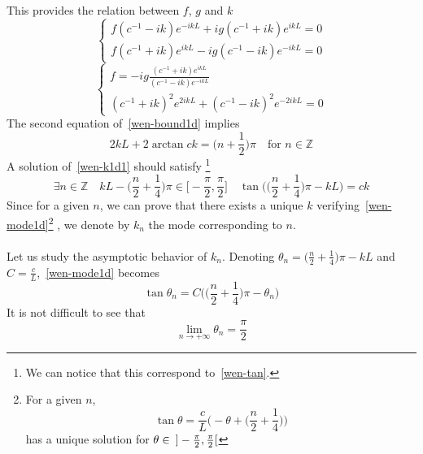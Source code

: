 This provides the relation between $f$, $g$ and $k$
\begin{equation*}
\begin{cases}
f(c^{-1} - ik)e^{-ikL} + ig(c^{-1} + ik)e^{ikL} = 0 \\
f(c^{-1} + ik)e^{ikL} - ig(c^{-1}- ik) e^{-ikL} = 0
\end{cases}
\end{equation*}
\ie
\begin{equation}\label{wen-bound1d}
\begin{cases}
f = -ig \frac{(c^{-1} + ik)e^{ikL}}{(c^{-1} - ik) e^{-ikL}} \\
%
(c^{-1} + ik)^2 e^{2ikL} + (c^{-1}-ik)^2 e^{-2ikL} = 0
\end{cases}
\end{equation}
The second equation of~\cref{wen-bound1d} implies
\begin{equation}\label{wen-k1d1}
2kL + 2\arctan{ck} = \big( n +\frac 1 2 \big) \pi \quad\textrm{for $n \in \mathbb Z$}
\end{equation}
A solution of~\cref{wen-k1d1} should satisfy
\footnote{We can notice that this correspond to~\cref{wen-tan}.}
\begin{equation}\label{wen-mode1d}
\exists n\in \mathbb{Z}\quad
kL - \big(\frac{n}{2} + \frac 1 4 \big) \pi \in \big[-\frac{\pi}{2}, \frac{\pi}{2}\big] \quad
\tan\Big( \big(\frac{n}{2}+\frac 1 4 \big)\pi -kL \Big) = ck
\end{equation}
Since for a given $n$, we can prove that there exists a unique $k$ verifying~\cref{wen-mode1d}\footnote{
For a given $n$, 
\begin{equation*}
\tan \theta = \frac c L \Big( -\theta + \big( \frac n 2 + \frac 1 4 \big)\Big)
\end{equation*}
has a unique solution for $\theta \in \enskip] -\frac{\pi}{2}, \frac{\pi}{2}[$
}
, we denote by $k_n$ the mode corresponding to $n$. \\\\
Let us study the asymptotic behavior of $k_n$. 
Denoting $\theta_n = \big( \frac n 2 + \frac 1 4 \big)\pi - kL$ and $C = \frac c L$,~\cref{wen-mode1d} becomes
\begin{equation}\label{wen-modetheta}
\tan \theta_n = C \Big( \big(\frac n 2 +\frac 1 4 \big)\pi - \theta_n \Big)
\end{equation} 
It is not difficult to see that 
\begin{equation*}
\lim_{n\rightarrow+\infty}\theta_n = \frac \pi 2
\end{equation*}
